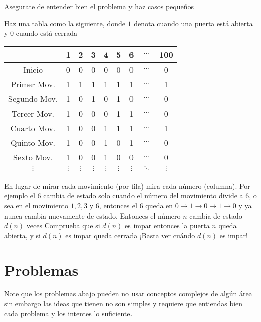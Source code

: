 \documentclass[11pt]{scrartcl}
\begin{document}
\begin{walkthrough} 
Asegurate de entender bien el problema y haz casos pequeños
 \begin{walk}
    \ii  Haz una tabla como la siguiente, donde $1$ denota cuando una puerta está abierta y $0$ cuando está cerrada
\begin{center}
\begin{tabular}{ c | c  c  c  c  c  c c c }

  & 1 & 2 & 3 & 4 & 5 & 6  &$\cdots$ & 100\\ \hline
Inicio & 0 & 0 & 0 & 0 & 0 & 0 &$\cdots$ & 0 \\
Primer Mov. & 1 & 1 & 1 & 1 & 1 & 1  &$\cdots$ & 1 \\
Segundo Mov. & 1 & 0 & 1 & 0 & 1 & 0  &$\cdots$ & 0 \\
Tercer Mov. & 1 & 0 & 0 & 0 & 1 & 1 &$\cdots$ & 0 \\
Cuarto Mov. & 1 & 0 & 0 & 1 & 1 & 1 &$\cdots$ & 1 \\
Quinto Mov. & 1 & 0 & 0 & 1 & 0 & 1 &$\cdots$ & 0\\
Sexto Mov. & 1 & 0 & 0 & 1 & 0 & 0 &$\cdots$ & 0 \\ 
$\vdots$ & $\vdots$ & $\vdots$ & $\vdots$ & $\vdots$ &$\vdots$ & $\vdots$ &$\ddots$& $\vdots$ \\

\end{tabular}
\end{center}
     \ii En lugar de mirar cada movimiento (por fila) mira cada número (columna).
    \ii Por ejemplo el $6$ cambia de estado solo cuando el número del movimiento divide a $6$, o sea en el movimiento $1,2,3$ y $6$, entonces el $6$ queda en $0\rightarrow 1\rightarrow 0\rightarrow 1\rightarrow 0$ y ya nunca cambia nuevamente de estado.
    \ii Entonces el número $n$ cambia de estado $d(n)$ veces
    \ii Comprueba que si $d(n)$ es impar entonces la puerta $n$ queda abierta, y si $d(n)$ es impar queda cerrada
    \ii ¡Basta ver cuándo $d(n)$ es impar!
\end{walk}
\end{walkthrough}

\section{Problemas}
Note que los problemas abajo pueden no usar conceptos complejos de algún área sin embargo las ideas que tienen no son simples y requiere que entiendas bien cada problema y los intentes lo suficiente.
\end{document}
